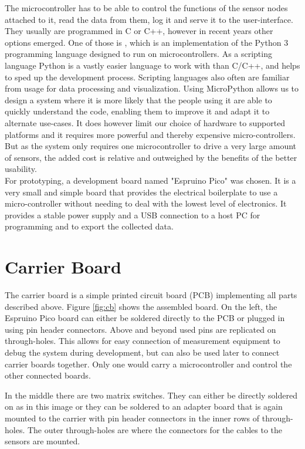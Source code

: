 The microcontroller has to be able to control the functions of the sensor nodes attached to it, read the data from them, log it and serve it to the user-interface. They usually are programmed in C or C++, however in recent years other options emerged. One of those is \textcite{upy}, which is an implementation of the Python 3 programming language designed to run on microcontrollers. As a scripting language Python is a vastly easier language to work with than C/C++, and helps to sped up the development process. Scripting languages also often are familiar from usage for data processing and visualization. Using MicroPython allows us to design a system where it is more likely that the people using it are able to quickly understand the code, enabling them to improve it and adapt it to alternate use-cases.
It does however limit our choice of hardware to supported platforms and it requires more powerful and thereby expensive micro-controllers. But as the system only requires one microcontroller to drive a very large amount of sensors, the added cost is relative and outweighed by the benefits of the better usability.\\

For prototyping, a development board named "Espruino Pico" was chosen. It is a very small and simple board that provides the electrical boilerplate to use a micro-controller without needing to deal with the lowest level of electronics. It provides a stable power supply and a USB connection to a host PC for programming and to export the collected data.

\section{Carrier Board}

The carrier board is a simple printed circuit board (PCB) implementing all parts described above. Figure \ref{fig:cb} shows the assembled board. On the left, the Espruino Pico board can either be soldered directly to the PCB or plugged in using pin header connectors. Above and beyond used pins are replicated on through-holes. This allows for easy connection of measurement equipment to debug the system during development, but can also be used later to connect carrier boards together. Only one would carry a microcontroller and control the other connected boards.

In the middle there are two matrix switches. They can either be directly soldered on as in this image or they can be soldered to an adapter board that is again mounted to the carrier with pin header connectors in the inner rows of through-holes.  The outer through-holes are where the connectors for the cables to the sensors are mounted.

